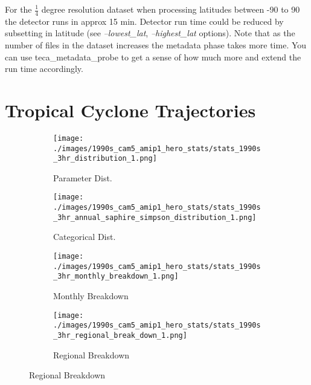 \documentclass[a4paper,10pt,DIV=12]{scrreprt}
\begin{document}
For the $\frac{1}{4}$ degree resolution dataset when processing latitudes between -90 to 90 the detector runs in approx 15 min. Detector run time could be reduced by subsetting in latitude (see \textit{--lowest\_lat}, \textit{--highest\_lat} options). Note that as the number of files in the dataset increases the metadata phase takes more time. You can use teca\_metadata\_probe to get a sense of how much more and extend the run time accordingly.

\section{Tropical Cyclone Trajectories}
\begin{figure}
    \centering
    \begin{subfigure}[b]{0.20\textwidth}
      \centering
      \texttt{[image: ./images/1990s\_cam5\_amip1\_hero\_stats/stats\_1990s\_3hr\_distribution\_1.png]}
      \caption{Parameter Dist.}
      \label{fig:dist}
    \end{subfigure}
    \begin{subfigure}[b]{0.245\textwidth}
      \centering
      \texttt{[image: ./images/1990s\_cam5\_amip1\_hero\_stats/stats\_1990s\_3hr\_annual\_saphire\_simpson\_distribution\_1.png]}
      \caption{Categorical Dist.}
      \label{fig:ass}
    \end{subfigure}
    \begin{subfigure}[b]{0.245\textwidth}
      \centering
      \texttt{[image: ./images/1990s\_cam5\_amip1\_hero\_stats/stats\_1990s\_3hr\_monthly\_breakdown\_1.png]}
      \caption{Monthly Breakdown}
      \label{fig:mon}
    \end{subfigure}
    \begin{subfigure}[b]{0.245\textwidth}
      \centering
      \texttt{[image: ./images/1990s\_cam5\_amip1\_hero\_stats/stats\_1990s\_3hr\_regional\_break\_down\_1.png]}
      \caption{Regional Breakdown}
      \label{fig:reg}
     \end{subfigure}
    \vspace{0.08in}

\end{figure}
\end{document}
